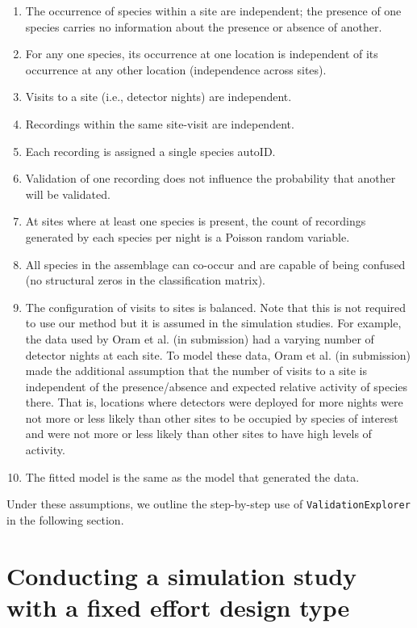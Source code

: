 \documentclass[
]{article}
\begin{document}
\begin{enumerate}
  \item  The occurrence of species within a site are independent; the presence of one species carries no information about the presence or absence of another.
  \item For any one species, its occurrence at one location is independent of its occurrence at any other location (independence across sites).
  \item Visits to a site (i.e., detector nights) are independent. 
  \item Recordings within the same site-visit are independent.
  \item Each recording is assigned a single species autoID.
  \item Validation of one recording does not influence the probability that another will be validated.
  \item At sites where at least one species is present, the count of recordings generated by each species per night is a Poisson random variable.
  \item All species in the assemblage can co-occur and are capable of being confused (no structural zeros in the classification matrix). 
  \item The configuration of visits to sites is balanced. Note that this is not required to use our method but it is assumed in the simulation studies. For example, the data used by Oram et al. (in submission) had a varying number of detector nights at each site. To model these data, Oram et al. (in submission) made the additional assumption that the number of visits to a site is independent of the presence/absence and expected relative activity of species there. That is, locations where detectors were deployed for more nights were not more or less likely than other sites to be occupied by species of interest and were not more or less likely than other sites to have high levels of activity. 
  \item The fitted model is the same as the model that generated the data.
\end{enumerate}

\noindent Under these assumptions, we outline the step-by-step use of \texttt{ValidationExplorer} in the following section.

\section{\texorpdfstring{Conducting a simulation study with a fixed effort design type \label{FEEx}}{Conducting a simulation study with a fixed effort design type }}\label{conducting-a-simulation-study-with-a-fixed-effort-design-type}
\end{document}
